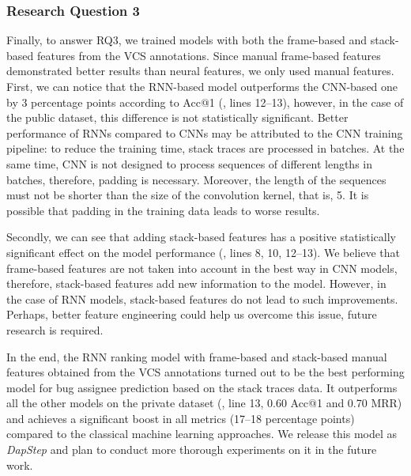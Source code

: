 
\subsubsection{Research Question 3} 

Finally, to answer RQ3, we trained models with both the frame-based and stack-based features from the VCS annotations. Since manual frame-based features demonstrated better results than neural features, we only used manual features. First, we can notice that the RNN-based model outperforms the CNN-based one by 3 percentage points according to Acc@1 (, lines 12--13), however, in the case of the public dataset, this difference is not statistically significant. 
Better performance of RNNs compared to CNNs may be attributed to the CNN training pipeline: to reduce the training time, stack traces are processed in batches. At the same time, CNN is not designed to process sequences of different lengths in batches, therefore, padding is necessary.  Moreover, the length of the sequences must not be shorter than the size of the convolution kernel, that is, 5. It is possible that padding in the training data leads to worse results. 

Secondly, we can see that adding stack-based features has a positive statistically significant effect on the model performance (, lines 8, 10, 12--13). 
We believe that frame-based features are not taken into account in the best way in CNN models, therefore, stack-based features add new information to the model. However, in the case of RNN models, stack-based features do not lead to such improvements. Perhaps, better feature engineering could help us overcome this issue, future research is required.


In the end, the RNN ranking model with frame-based and stack-based manual features obtained from the VCS annotations turned out to be the best performing model for bug assignee prediction based on the stack traces data. 
It outperforms all the other models on the private dataset (, line 13, 0.60 Acc@1 and 0.70 MRR) and achieves a significant boost in all metrics (17--18 percentage points) compared to the classical machine learning approaches. We release this model as \textit{DapStep} and plan to conduct more thorough experiments on it in the future work.

